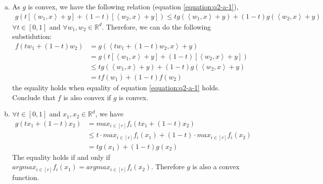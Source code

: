 \begin{enumerate}[(a)]
    \item As $g$ is convex, we have the following relation (equation \ref{equation:q2-a-1}),
    \begin{align} \label{equation:q2-a-1}
        g\left(t \left[ \left\langle w_1, x\right\rangle + y \right] + (1-t) \left[ \left\langle w_2, x \right\rangle + y \right] \right) \leq t g(\left\langle w_1, x\right\rangle + y ) + (1-t) g(\left\langle w_2, x\right\rangle + y )
    \end{align}
    $\forall t \in \left[0,1\right]$ and $\forall w_1, w_2 \in \mathbb{R}^d$. Therefore, we can do the following substidution:
    \begin{align*}
        f(t w_1 + (1-t) w_2) &= g(\left\langle tw_1 + (1-t) w_2, x\right\rangle + y ) \\
        &= g\left( t \left[\left\langle w_1, x\right\rangle + y\right] + \left(1-t\right) \left[\left\langle w_2, x\right\rangle + y\right] \right) \\
        &\leq t g(\left\langle w_1, x\right\rangle + y ) + (1-t) g(\left\langle w_2, x\right\rangle + y ) \\
        &= tf(w_1) + (1-t)f(w_2)
    \end{align*}
    the equality holds when equality of equation \ref{equation:q2-a-1} holds. Conclude that $f$ is also convex if $g$ is convex.

    \item $\forall t \in \left[0,1\right]$ and $x_1, x_2 \in \mathbb{R}^d$, we have
    \begin{align*}
        g(tx_1 + (1-t)x_2) &= max_{i \in [r]}f_i(tx_1 + (1-t)x_2) \\
        &\leq t \cdot max_{i \in [r]}f_i(x_1) + (1-t) \cdot  max_{i \in [r]}f_i(x_2) \\
        &= tg(x_1) + (1-t)g(x_2)
    \end{align*}
    The equality holds if and only if $argmax_{i \in [r]}f_i(x_1) = argmax_{i \in [r]}f_i(x_2)$. Therefore $g$ is also a convex function.
\end{enumerate}

